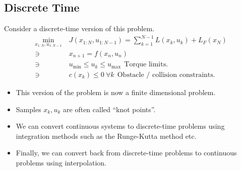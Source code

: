 \subsection{Discrete Time}
Consider a discrete-time version of this problem.
\begin{align}
    \min_{x_{1:N}, u_{1:N-1}} \ & J(x_{1:N}, u_{1:N-1}) = \sum_{k=1}^{N-1} L(x_k, u_k) + L_F(x_N) \\
    \ni \ & x_{n+1} = f(x_n,u_n) \\
    \ni \ & u_{\min} \leq u_k \leq u_{\max} \ \ \textrm{Torque limits.} \\
    \ni \ & c(x_k) \leq 0 \ \forall k \ \ \textrm{Obstacle / collision constraints.}
\end{align}
\begin{itemize}
    \item This version of the problem is now a finite dimensional problem.
    \item Samples $x_k,u_k$ are often called ``knot points''.
    \item We can convert continuous systems to discrete-time problems using integration methods such as the Runge-Kutta method etc.
    \item Finally, we can convert back from discrete-time problems to continuous problems using interpolation.
\end{itemize}



